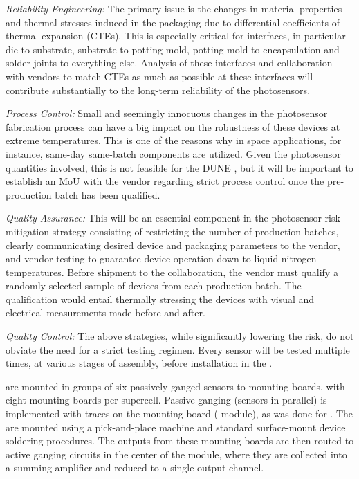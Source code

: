 {\textit{Reliability Engineering:}} The primary issue is the changes in material properties and thermal stresses induced in the packaging due to differential coefficients of thermal expansion (CTEs). This is especially critical for interfaces, in particular %
die-to-substrate, substrate-to-potting mold, potting mold-to-encapsulation and solder joints-to-everything else. Analysis of these interfaces and collaboration with vendors to match CTEs as much as possible at these interfaces will contribute substantially to the long-term reliability of the photosensors.

{\textit{Process Control:}} Small and seemingly innocuous %
changes in the photosensor fabrication process can have a big impact on the robustness of these devices at extreme temperatures. This is one of the reasons why in space applications, for instance, same-day same-batch components are utilized. Given the photosensor quantities involved, this %
is not feasible for the DUNE , but %
it will be important to establish an MoU with the vendor regarding %
strict process control once the pre-production batch has been qualified.

{\textit{Quality Assurance:}} This will be an essential component in the photosensor risk mitigation strategy consisting of restricting the number of production batches, clearly communicating desired device and packaging parameters to the vendor, and vendor testing to 
guarantee device operation down to liquid nitrogen temperatures. %
Before shipment to the collaboration, the vendor %
must qualify a randomly selected sample of devices from each production batch. The qualification would entail thermally stressing the devices %
with visual and electrical measurements made before and after. 

{\textit{Quality Control:}} The above strategies, while significantly lowering the risk, do not obviate the need for a strict testing regimen. Every sensor will be tested multiple times, at various stages of assembly, before installation in the .

 are mounted in groups of six passively-ganged sensors to mounting boards, with eight mounting boards per supercell.  Passive ganging (sensors in parallel) is implemented with traces on the  mounting board ( module), %
as was done for .  The  are mounted using a pick-and-place machine and standard surface-mount device soldering procedures. The outputs from these mounting boards are then routed to active ganging circuits in the center of the  module, where they are collected into a summing amplifier and reduced to a single output channel.

